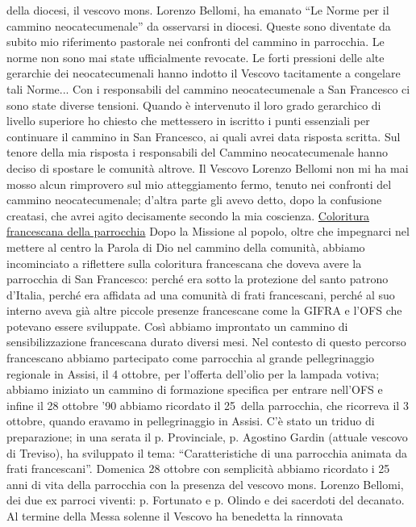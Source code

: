 della diocesi, il vescovo mons. Lorenzo Bellomi, ha emanato “Le Norme per il cammino 
neocatecumenale” da osservarsi in diocesi. Queste sono diventate da subito mio riferimento 
pastorale nei confronti del cammino in parrocchia. Le norme non sono mai state ufficialmente 
revocate. Le forti pressioni delle alte gerarchie dei neocatecumenali hanno indotto il Vescovo 
tacitamente a congelare tali Norme...
Con i responsabili del cammino neocatecumenale a San Francesco ci sono state diverse tensioni. 
Quando è intervenuto il loro grado gerarchico di livello superiore ho chiesto che mettessero in 
iscritto i punti essenziali per continuare il cammino in San Francesco, ai quali avrei data risposta 
scritta. Sul tenore della mia risposta i responsabili del Cammino neocatecumenale hanno deciso di 
spostare le comunità altrove. Il Vescovo Lorenzo Bellomi non mi ha mai mosso alcun rimprovero 
sul mio atteggiamento fermo, tenuto nei confronti del cammino neocatecumenale; d'altra parte gli 
avevo detto, dopo la confusione creatasi, che avrei agito decisamente secondo la mia coscienza.
\bigbreak
{}
\noindent \underline{Coloritura francescana della parrocchia}
\medbreak
\noindent Dopo la Missione al popolo, oltre che impegnarci nel mettere al centro la Parola di Dio nel 
cammino della comunità, abbiamo incominciato a riflettere sulla coloritura francescana che doveva 
avere la parrocchia di San Francesco: perché era sotto la protezione del santo patrono d'Italia,  
perché era affidata ad una comunità di frati francescani, perché al suo interno aveva già altre piccole 
presenze francescane come la GIFRA e l'OFS che potevano essere sviluppate. Così abbiamo 
improntato un cammino di sensibilizzazione francescana durato diversi mesi. Nel contesto di questo 
percorso francescano abbiamo partecipato come parrocchia al grande pellegrinaggio regionale in 
Assisi, il 4 ottobre, per l'offerta dell'olio per la lampada votiva; abbiamo iniziato un cammino di 
formazione specifica per entrare nell'OFS e infine il 28 ottobre '90 abbiamo ricordato il 25\textdegree\ della 
parrocchia, che ricorreva il 3 ottobre, quando eravamo in pellegrinaggio in Assisi. 
C'è stato un triduo di preparazione; in una serata il p. Provinciale, p. Agostino Gardin 
(attuale vescovo di Treviso), ha sviluppato il tema: “Caratteristiche di una parrocchia animata da 
frati francescani”. 
Domenica 28 ottobre con semplicità abbiamo ricordato i 25 anni di vita della parrocchia con la 
presenza del vescovo mons. Lorenzo Bellomi, dei due ex parroci viventi: p. Fortunato e p. Olindo e 
dei sacerdoti del decanato. Al termine della Messa solenne il Vescovo ha benedetta la rinnovata 
